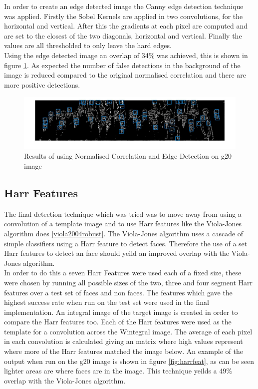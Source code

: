 \documentclass{article}
\begin{document}
In order to create an edge detected image the Canny edge detection technique was
applied. Firstly the Sobel Kernels are applied in two
convolutions, for the horizontal and vertical. After this the gradients at each pixel
are computed and are set to the closest of the two diagonals, horizontal and vertical.
Finally the values are all thresholded to only leave the hard edges.\\

Using the edge detected image an overlap of 34\% was achieved, this is shown in
figure \ref{fig:edgedet}. As expected the number of false detections in the background
of the image is reduced compared to the original normalised correlation and there
are more positive detections.

\begin{figure}[H]
  \includegraphics[width=\linewidth]{edgedetect.jpg}
  \caption{Results of using Normalised Correlation and Edge Detection on g20 image}
  \label{fig:edgedet}
\end{figure}

\subsection{Harr Features}

The final detection technique which was tried was to move away from using a convolution
of a template image and to use Harr features like the Viola-Jones algorithm does \ref{viola2004robust}.
The Viola-Jones algorithm uses a cascade of simple classifiers using a Harr feature
to detect faces. Therefore the use of a set Harr features to detect an face should yeild
an improved overlap with the Viola-Jones algorithm.\\

In order to do this a seven Harr Features were used each of a fixed size, these
were chosen by running all possible sizes of the two, three and four segment Harr
features over a test set of faces and non faces. The features which gave the highest
success rate when run on the test set were used in the final implementation. An
integral image of the target image is created in order to compare the Harr features
too. Each of the Harr features were used as the template for a convolution across the
Wintegral image. The average of each pixel in each convolution is calculated giving an
matrix where high values represent where more of the Harr features matched the image below.
An example of the output when run on the g20 image is shown in figure \ref{fig:harrfeat},
as can be seen lighter areas are where faces are in the image. This technique yeilds
a 49\% overlap with the Viola-Jones algorithm.
\end{document}
